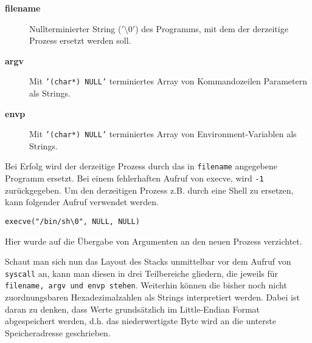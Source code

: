 \documentclass[12pt]{article}
\begin{document}
\begin{description}
    \item [\textbf{filename}] Nullterminierter String ($'\setminus0'$) des Programms, mit dem der derzeitige Prozess ersetzt werden soll.

    \item [\textbf{argv}] Mit \texttt{'(char*) NULL'} terminiertes Array von Kommandozeilen Parametern als Strings. 

    \item [\textbf{envp}] Mit \texttt{'(char*) NULL'} terminiertes Array von Environment-Variablen als Strings.
\end{description}
Bei Erfolg wird der derzeitige Prozess durch das in \texttt{filename} angegebene Programm ersetzt. Bei einem fehlerhaften Aufruf von execve, wird \texttt{-1} zurückgegeben.
\newline
\newline
Um den derzeitigen Prozess z.B. durch eine Shell zu ersetzen, kann folgender Aufruf verwendet werden.
\begin{lstlisting}
execve("/bin/sh\0", NULL, NULL)
\end{lstlisting}
Hier wurde auf die Übergabe von Argumenten an den neuen Prozess verzichtet.
\newline

Schaut man sich nun das Layout des Stacks unmittelbar vor dem Aufruf von \texttt{syscall} an, kann man diesen in drei Teilbereiche gliedern, die jeweils für \texttt{filename, argv und envp stehen}. Weiterhin können die bisher noch nicht zuordnungsbaren Hexadezimalzahlen als Strings interpretiert werden. Dabei ist daran zu denken, dass Werte grundsätzlich im Little-Endian Format abgespeichert werden, d.h. das niederwertigste Byte wird an die unterste Speicheradresse geschrieben.
\end{document}
